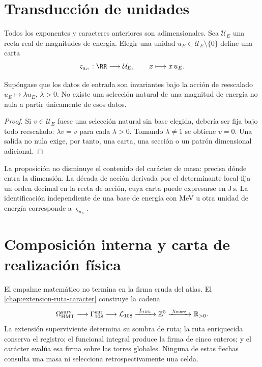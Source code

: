 \section{Transducción de unidades}

Todos los exponentes y caracteres anteriores son adimensionales. Sea
\(\mathcal U_E\) una recta real de magnitudes de energía. Elegir una unidad
\(u_E\in\mathcal U_E\setminus\{0\}\) define una carta
\[
 \varsigma_{u_E}:\RR\longrightarrow\mathcal U_E,
 \qquad x\longmapsto x\,u_E.
\]

\begin{proposition}
\label{prop:no-unidad-desde-adimensional}
Supóngase que los datos de entrada son invariantes bajo la acción de
reescalado \(u_E\mapsto\lambda u_E\), \(\lambda>0\). No existe una selección
natural de una magnitud de energía no nula a partir únicamente de esos datos.
\end{proposition}
\begin{proof}
Si \(v\in\mathcal U_E\) fuese una selección natural sin base elegida, debería
ser fija bajo todo reescalado: \(\lambda v=v\) para cada \(\lambda>0\). Tomando
\(\lambda\ne1\) se obtiene \(v=0\). Una salida no nula exige, por tanto, una
carta, una sección o un patrón dimensional adicional.
\end{proof}

La proposición no disminuye el contenido del carácter de masa: precisa dónde
entra la dimensión. La década de acción derivada por el determinante local
fija un orden decimal en la recta de acción, cuya carta puede expresarse en
\(\mathrm{J\,s}\). La identificación independiente de una base de energía con
MeV u otra unidad de energía corresponde a \(\varsigma_{u_E}\).

\section{Composición interna y carta de realización física}

El empalme matemático no termina en la firma cruda del atlas. El
\cref{chap:extension-ruta-caracter} construye la cadena
\[
\Omega_{\rm HMT}^{\rm surv}
\longrightarrow
\Gamma_{108}^{\rm enr}
\longrightarrow
\mathcal L_{108}
\xrightarrow{\ L_{\rm tick}\ }
\mathbb Z^5
\xrightarrow{\ \chi_{\rm mass}\ }
\mathbb R_{>0}.
\]
La extensión superviviente determina su sombra de ruta; la ruta enriquecida
conserva el registro; el funcional integral produce la firma de cinco
enteros; y el carácter evalúa esa firma sobre las torres globales. Ninguna de
estas flechas consulta una masa ni selecciona retrospectivamente una celda.

